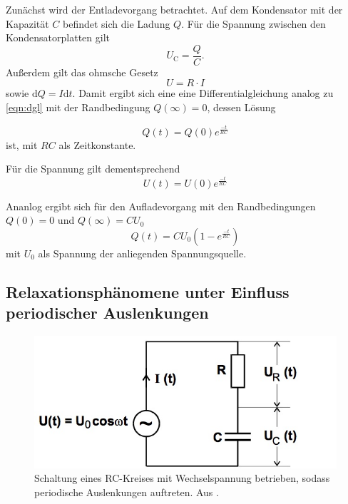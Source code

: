 Zunächst wird der Entladevorgang betrachtet. Auf dem Kondensator mit der Kapazität $C$ befindet sich die Ladung $Q$. Für die Spannung zwischen den Kondensatorplatten gilt
\begin{equation}
  U_{\mathrm C} = \frac{Q}{C} .
\end{equation}
Außerdem gilt das ohmsche Gesetz
\begin{equation}
  U = R \cdot I
\end{equation}
sowie $\mathrm{d}Q = I \mathrm{d}t$.  Damit ergibt sich eine eine Differentialgleichung analog zu \ref{eqn:dgl} mit der Randbedingung $Q(\infty)  = 0$, dessen Lösung

\begin{equation}
  Q(t) = Q(0) e^{\frac{-t}{RC}}
\end{equation}
ist, mit $RC$ als Zeitkonstante.

Für die Spannung gilt dementsprechend
\begin{equation}
  \label{a}
  U(t) = U(0) e^{\frac{-t}{RC}}
\end{equation}

Ananlog ergibt sich für den Aufladevorgang mit den Randbedingungen $Q(0) = 0$ und $Q(\infty) = CU_0$
\begin{equation}
  Q(t) = CU_0(1 - e^{\frac{-t}{RC}})
\end{equation}
mit $U_0$ als Spannung der anliegenden Spannungsquelle.

\subsection{Relaxationsphänomene unter Einfluss periodischer Auslenkungen}

\begin{figure}
  \centering
  \includegraphics[scale=0.5]{content/RC-periodisch.jpg}
  \caption{Schaltung eines RC-Kreises mit Wechselspannung betrieben, sodass periodische Auslenkungen auftreten. Aus \cite{anleitung353}.}
  \label{fig:rc-periodisch}
\end{figure}

